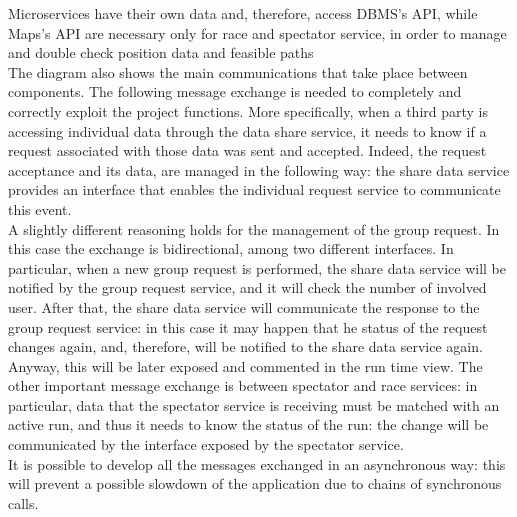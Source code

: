 Microservices have their own data and, therefore, access DBMS's API, while Maps's API are necessary 
only for race and spectator service, in order to manage and double check position data and feasible paths
\\
The diagram also shows the main communications that take place between components. The following message exchange is needed to completely and
correctly exploit the project functions. 
More specifically, when a third party is accessing individual data through the data share service, it
needs to know if a request associated with those data was sent and accepted. 
Indeed, the request acceptance and its data, are managed in the following way: the share data service provides an  interface that enables the
individual request service to communicate this event. \\ 
A slightly different reasoning holds for the management of the group request. In this case the exchange is bidirectional, among two different
interfaces. 
In particular, when a new group request is performed, the share data service will be notified by the group request service, and it will check
the number of involved user.
After that, the share data service will communicate the response to the group request service: in this case it may happen that he status of
the request changes again, and, therefore, will be notified to the share data service again. Anyway, this will be later exposed and commented
in the run time view.  
The other important message exchange is between spectator and race services: in particular, data that the spectator service is receiving must
be matched with an active run, and thus it needs to know the status of the run: the change will be communicated by the interface exposed
by the spectator service. \\
It is possible to develop all the messages exchanged in an asynchronous way: this will prevent a possible slowdown of the application 
due to chains of synchronous calls.